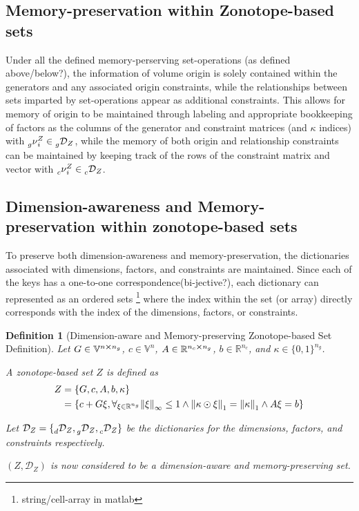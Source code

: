 \documentclass[11pt]{article}
\newtheorem{definition}{Definition}
\newcommand{\R}{\mathbb{R}} %
\newcommand{\V}{\mathbb{V}} %
\newcommand{\Key}{\nu} %
\newcommand{\Dict}{\mathcal{D}} %
\newcommand{\dimDict}{\prescript{}{d}{\Dict}} %
\newcommand{\factorKey}{\prescript{}{g}{\Key}} %
\newcommand{\factorDict}{\prescript{}{g}{\Dict}} %
\newcommand{\conKey}{\prescript{}{c}{\Key}} %
\newcommand{\conDict}{\prescript{}{c}{\Dict}} %
\newcommand{\dSet}{\kappa} %
\begin{document}
\subsection{Memory-preservation within Zonotope-based sets}
Under all the defined memory-perserving set-operations (as defined above/below?), the information of volume origin is solely contained within the generators and any associated origin constraints, while the relationships between sets imparted by set-operations appear as additional constraints.
This allows for memory of origin to be maintained through labeling and appropriate bookkeeping of factors as the columns of the generator and constraint matrices (and $\dSet$ indices) with $\factorKey^{Z}_{i} \in \factorDict_{Z}$, while the memory of both origin and relationship constraints can be maintained by keeping track of the rows of the constraint matrix and vector with $\conKey^{Z}_{i} \in \conDict_{Z}$.

\subsection{Dimension-awareness and Memory-preservation within zonotope-based sets}

To preserve both dimension-awareness and memory-preservation, the dictionaries associated with dimensions, factors, and constraints are maintained.
Since each of the keys has a one-to-one correspondence(bi-jective?), each dictionary can represented as an ordered sets \footnote{string/cell-array in matlab} where the index within the set (or array) directly corresponds with the index of the dimensions, factors, or constraints.

\begin{definition}[Dimension-aware and Memory-preserving Zonotope-based Set Definition]\label{def:dim-aware_mem-presev_setDef}
	Let $G \in \V^{n \cross n_g}$, $c \in \V^{n}$, $A \in \R^{n_c \cross n_g}$, $b \in \R^{n_c}$, and $\dSet \in \{0,1\}^{n_g}$.

	A zonotope-based set $Z$ is defined as
	\begin{equation}
		\begin{aligned}
			Z &= \{G,c,A,b,\dSet\} \\
			&= \qty{c + G \xi,  \forall_{\xi \in \R^{n_g}} \norm{\xi}_\infty \leq 1 \land \norm{\dSet \odot \xi}_{1} = \norm{\dSet}_{1} \land A\xi = b}
		\end{aligned}
	\end{equation}

	Let $\Dict_{Z} = \{\dimDict_{Z},\factorDict_{Z},\conDict_{Z}\}$ be the dictionaries for the dimensions, factors, and constraints respectively.
	
	$(Z,\Dict_{Z})$ is now considered to be a dimension-aware and memory-preserving set.
	
	\todo{should we do $(Z,\Dict_{Z})$ or $Z = \{G,c,A,b,\dSet,\Dict_{Z}\}$?}
\end{definition}
\end{document}
